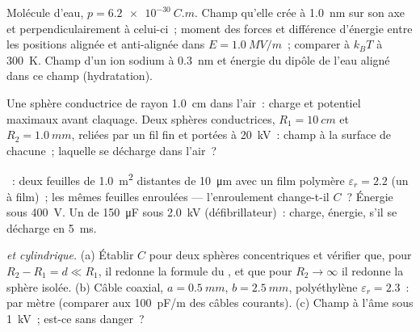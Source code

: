 \begin{exercise}[$\star\star$]\label{exo:b1:potential-capacitors:7}
Molécule d'eau, $p = \qty{6.2e-30}{C.m}$. Champ qu'elle crée à \qty{1.0}{nm}
sur son axe et perpendiculairement à celui-ci~; moment des forces et différence
d'énergie entre les positions alignée et anti-alignée dans $E = \qty{1.0}{MV/m}$~;
comparer à $k_BT$ à \qty{300}{K}. Champ d'un ion sodium à
\qty{0.3}{nm} et énergie du dipôle de l'eau aligné dans ce champ (hydratation).
\end{exercise}

\begin{exercise}[$\star\star$]\label{exo:b1:potential-capacitors:8}
Une sphère conductrice de rayon \qty{1.0}{cm} dans l'air~: charge et potentiel
maximaux avant claquage. Deux sphères conductrices, $R_1 = \qty{10}{cm}$
et $R_2 = \qty{1.0}{mm}$, reliées par un fil fin et portées à
\qty{20}{kV}~: champ à la surface de chacune~; laquelle se décharge dans l'air~?
\end{exercise}

\begin{exercise}[$\star\star$]\label{exo:b1:potential-capacitors:9}
~: deux feuilles de \qty{1.0}{m^2} distantes de \qty{10}{\micro m}
avec un film polymère $\varepsilon_r = 2.2$ (un  à film)~; les
mêmes feuilles enroulées --- l'enroulement change-t-il $C$~? Énergie sous \qty{400}{V}. Un  de \qty{150}{\micro F}
sous \qty{2.0}{kV} (défibrillateur)~: charge, énergie,  s'il
se décharge en \qty{5}{ms}.
\end{exercise}

\begin{exercise}[$\star\star\star$]\label{exo:b1:potential-capacitors:10}
\emph{ et cylindrique.} (a) Établir $C$ pour deux
sphères concentriques et vérifier que, pour $R_2 - R_1 = d \ll R_1$, il redonne
la formule du , et que pour $R_2 \to \infty$ il redonne la
sphère isolée. (b) Câble coaxial, $a = \qty{0.5}{mm}$, $b = \qty{2.5}{mm}$,
polyéthylène $\varepsilon_r = 2.3$~:  par mètre (comparer aux
\qty{100}{pF/m} des câbles courants). (c) Champ à l'âme sous
\qty{1}{kV}~; est-ce sans danger~?
\end{exercise}

